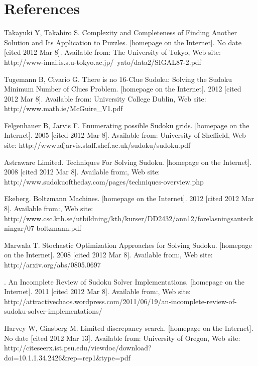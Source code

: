 \documentclass[a4paper,11pt]{kth-mag}
\begin{document}
\section{References}

\begin{thebibliography}{99}

Takayuki Y, Takahiro S. Complexity and Completeness of Finding Another Solution and Its Application to Puzzles. [homepage on the Internet]. No date [cited 2012 Mar 8]. Available from: The University of Tokyo, Web site: http://www-imai.is.s.u-tokyo.ac.jp/~yato/data2/SIGAL87-2.pdf

Tugemann B, Civario G. There is no 16-Clue Sudoku: Solving the Sudoku Minimum Number of Clues Problem. [homepage on the Internet]. 2012 [cited 2012 Mar 8]. Available from: University College Dublin, Web site: http://www.math.ie/McGuire\_V1.pdf

Felgenhauer B, Jarvis F. Enumerating possible Sudoku grids. [homepage on the Internet]. 2005 [cited 2012 Mar 8]. Available from: University of Sheffield, Web site: http://www.afjarvis.staff.shef.ac.uk/sudoku/sudoku.pdf

Astraware Limited. Techniques For Solving Sudoku. [homepage on the Internet]. 2008 [cited 2012 Mar 8]. Available from:, Web site: http://www.sudokuoftheday.com/pages/techniques-overview.php

Ekeberg. Boltzmann Machines. [homepage on the Internet]. 2012 [cited 2012 Mar 8]. Available from:, Web site: http://www.csc.kth.se/utbildning/kth/kurser/DD2432/ann12/forelasningsanteckningar/07-boltzmann.pdf

Marwala T. Stochastic Optimization Approaches for Solving Sudoku. [homepage on the Internet]. 2008 [cited 2012 Mar 8]. Available from:, Web site: http://arxiv.org/abs/0805.0697

. An Incomplete Review of Sudoku Solver Implementations. [homepage on the Internet]. 2011 [cited 2012 Mar 8]. Available from:, Web site: http://attractivechaos.wordpress.com/2011/06/19/an-incomplete-review-of-sudoku-solver-implementations/

Harvey W, Ginsberg M. Limited discrepancy search. [homepage on the Internet]. No date [cited 2012 Mar 13]. Available from: University of Oregon, Web site: http://citeseerx.ist.psu.edu/viewdoc/download?doi=10.1.1.34.2426\&rep=rep1\&type=pdf


\end{thebibliography}
\end{document}
